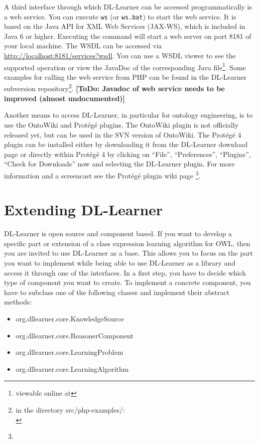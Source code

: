 \documentclass[a4paper,12pt]{scrartcl}
\newcommand{\todo}[1]{\textbf{[ToDo: #1]}}
\begin{document}
A third interface through which DL-Learner can be accessed programmatically is a web service. You can execute \verb|ws| (or \verb|ws.bat|) to start the web service. It is based on the Java API for XML Web Services (JAX-WS), which is included in Java 6 or higher. Executing the command will start a web server on port 8181 of your local machine. The WSDL can be accessed via \url{http://localhost:8181/services?wsdl}. You can use a WSDL viewer to see the supported operation 
or view the JavaDoc of the corresponding Java file\footnote{viewable online at \wsjavadoc}. 
Some examples for calling the web service from PHP can be found in the DL-Learner subversion 
repository\footnote{in the directory src/php-examples/:\\ \wsphpexamples}.
\todo{Javadoc of web service needs to be improved (almost undocumented)}

Another means to access DL-Learner, in particular for ontology engineering, is to use the OntoWiki and Protégé plugins. The OntoWiki plugin is not officially released yet, but can be used in the SVN version of OntoWiki. The Protégé 4 plugin can be installed either by downloading it from the DL-Learner download page or directly within Protégé 4 by clicking on ``File'', ``Preferences'', ``Plugins'', ``Check for Downloads'' now and selecting the DL-Learner plugin. For more information and a screencast see the Protégé plugin wiki page \footnote{\wikiprotplugin}.

\section{Extending DL-Learner}
\label{sec:developing}

DL-Learner is open source and component based. If you want to develop a specific part or extension of a class expression learning algorithm for OWL, then you are invited to use DL-Learner as a base. This allows you to focus on the part you want to implement while being able to use DL-Learner as a library and access it through one of the interfaces. In a first step, you have to decide which type of component you want to create. To implement a concrete component, you have to subclass one of the following classes and implement their abstract methods:

\begin{itemize}
 \item org.dllearner.core.KnowledgeSource
 \item org.dllearner.core.ReasonerComponent
 \item org.dllearner.core.LearningProblem
 \item org.dllearner.core.LearningAlgorithm
\end{itemize}
\end{document}

